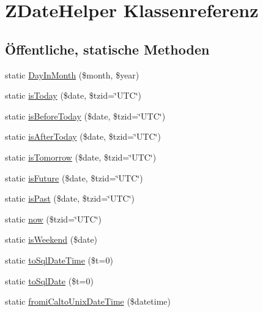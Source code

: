\hypertarget{class_z_date_helper}{}\section{Z\+Date\+Helper Klassenreferenz}
\label{class_z_date_helper}
\subsection*{Öffentliche, statische Methoden}
\begin{DoxyCompactItemize}
\item 
static \mbox{\hyperlink{class_z_date_helper_a07c2f5d03c39f5b0ad4f9309f567e3a0}{Day\+In\+Month}} (\$month, \$year)
\item 
static \mbox{\hyperlink{class_z_date_helper_a9026d7cb38c1f279754f7d43fb47572a}{is\+Today}} (\$date, \$tzid=\char`\"{}U\+TC\char`\"{})
\item 
static \mbox{\hyperlink{class_z_date_helper_addd7e6580a5e38133d5915a00d36decb}{is\+Before\+Today}} (\$date, \$tzid=\char`\"{}U\+TC\char`\"{})
\item 
static \mbox{\hyperlink{class_z_date_helper_a6b6623063dc65177264c8c1f769f5cdb}{is\+After\+Today}} (\$date, \$tzid=\char`\"{}U\+TC\char`\"{})
\item 
static \mbox{\hyperlink{class_z_date_helper_aec94814bd48ff1c53fc0c7a68b5d00d9}{is\+Tomorrow}} (\$date, \$tzid=\char`\"{}U\+TC\char`\"{})
\item 
static \mbox{\hyperlink{class_z_date_helper_ac64e4613edfaf5e0975c85ff30959387}{is\+Future}} (\$date, \$tzid=\char`\"{}U\+TC\char`\"{})
\item 
static \mbox{\hyperlink{class_z_date_helper_af533ff8e331d811b7d789c5cbf76b068}{is\+Past}} (\$date, \$tzid=\char`\"{}U\+TC\char`\"{})
\item 
static \mbox{\hyperlink{class_z_date_helper_a6122b39577d89c503d1c20a445fc1eff}{now}} (\$tzid=\char`\"{}U\+TC\char`\"{})
\item 
static \mbox{\hyperlink{class_z_date_helper_a8b7c2fb18fe8636c447968640551aa7c}{is\+Weekend}} (\$date)
\item 
static \mbox{\hyperlink{class_z_date_helper_a40b4ee29889ec7c6444648bd4e7bbd99}{to\+Sql\+Date\+Time}} (\$t=0)
\item 
static \mbox{\hyperlink{class_z_date_helper_a52d3743449d3e0004b1a0f17d6c70cab}{to\+Sql\+Date}} (\$t=0)
\item 
static \mbox{\hyperlink{class_z_date_helper_a404f7e1c78c663b1f2ce4065f5bec5cd}{fromi\+Calto\+Unix\+Date\+Time}} (\$datetime)

\end{DoxyCompactItemize}
